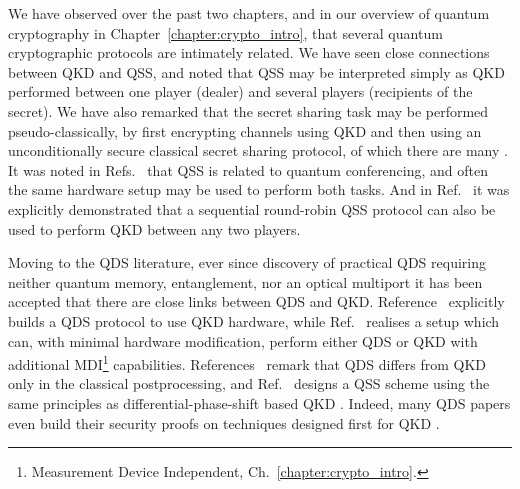 We have observed over the past two chapters, and in our overview of quantum cryptography in Chapter~\ref{chapter:crypto_intro}, that several quantum cryptographic protocols are intimately related. We have seen close connections between QKD and QSS, and noted that QSS may be interpreted simply as QKD performed between one player (dealer) and several players (recipients of the secret). We have also remarked that the secret sharing task may be performed pseudo-classically, by first encrypting channels using QKD and then using an unconditionally secure classical secret sharing protocol, of which there are many \cite{Shamir1979, Blakley1979, Schneier1996}. It was noted in Refs.~\cite{Hillery1999, Chen2005a, Wu2016, Ottaviani2017b} that QSS is related to quantum conferencing, and often the same hardware setup may be used to perform both tasks. And in Ref.~\cite{Grice2019} it was explicitly demonstrated that a sequential round-robin QSS protocol can also be used to perform QKD between any two players. 

Moving to the QDS literature, ever since discovery of practical QDS requiring neither quantum memory, entanglement, nor an optical multiport it has been accepted that there are close links between QDS and QKD. Reference~\cite{Wallden2015} explicitly builds a QDS protocol to use QKD hardware, while Ref.~\cite{Roberts2017} realises a setup which can, with minimal hardware modification, perform either QDS or QKD with additional MDI\footnote{Measurement Device Independent, Ch.~\ref{chapter:crypto_intro}.} capabilities. References~\cite{Collins2016, Yin2017, Yin2017c, An2019, Roberts2017} remark that QDS differs from QKD only in the classical postprocessing, and Ref.~\cite{Wei2018} designs a QSS scheme using the same principles as differential-phase-shift based QKD \cite{Sasaki2014}. Indeed, many QDS papers even build their security proofs on techniques designed first for QKD \cite{Kogias2017, Grice2019, Wei2018, Grice2015, Armstrong2015}.


